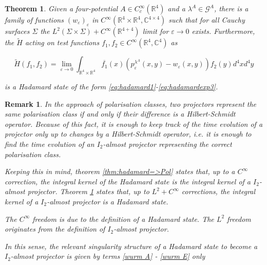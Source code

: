 \documentclass[a4paper,11pt]{article}
\newtheorem{thm}{Theorem}
\newtheorem{rmk}{Remark}
\begin{document}
\begin{thm}\label{thm:Pol=>hadamard}
Given a four-potential \(A\in C_c^\infty (\mathbb{R}^4)\) and a \(\lambda^A\in\mathcal{G}^A\), there is a family of functions
\((w_\varepsilon)_\varepsilon\) in \( C^\infty(\mathbb{R}^4 \times \mathbb{R}^4 ,\mathbb{C}^{4\times 4})\) such that for all Cauchy surfaces \(\Sigma\)
the \(L^2(\Sigma\times\Sigma)+C^\infty(\mathbb{R}^{4+4})\) %
limit for \(\varepsilon \rightarrow0\) exists. 
Furthermore, the \(\tilde{H}\) acting on test functions \(f_1,f_2\in C^\infty(\mathbb{R}^{4}, \mathbb{C}^4)\) as

\begin{equation}
\tilde{H}(f_1,f_2)=\lim_{\varepsilon \rightarrow 0} \int_{\mathbb{R}^{4}\times\mathbb{R}^4} \overline{f_1}(x)
\left(p_\varepsilon^{\lambda^A}(x,y)-w_\varepsilon(x,y)\right)f_2(y) d^4x d^4y
\end{equation}

is a Hadamard state of the form \eqref{eq:hadamard1}-\eqref{eq:hadamardexp3}.
\end{thm}

\begin{rmk}
In the approach of polarisation classes, two projectors represent the same polarisation class if and only if their difference is a Hilbert-Schmidt operator. 
Because of this fact, it is enough to keep track of the time evolution of a projector only up to changes by a Hilbert-Schmidt operator, i.e. it is enough
to find the time evolution of an \(I_2\)-almost projector representing the correct polarisation class. 

Keeping this in mind,
theorem \ref{thm:hadamard=>Pol} states that, up to a \(C^\infty\) correction, the integral kernel of the Hadamard state is the integral kernel of a \(I_2\)-almost projector.
Theorem \ref{thm:Pol=>hadamard} states that, up to \(L^2+C^\infty\) corrections, the integral kernel of a \(I_2\)-almost projector is a Hadamard state.

The \(C^\infty\) freedom is due to the definition of a Hadamard state. The \(L^2\) freedom originates from the definition of \(I_2\)-almost projector.

In this sense, the relevant singularity structure of a Hadamard state to become a \(I_2\)-almost projector is given by terms \eqref{wurm A} - \eqref{wurm E} only
\end{rmk}


\label{wurm A}
\end{document}
